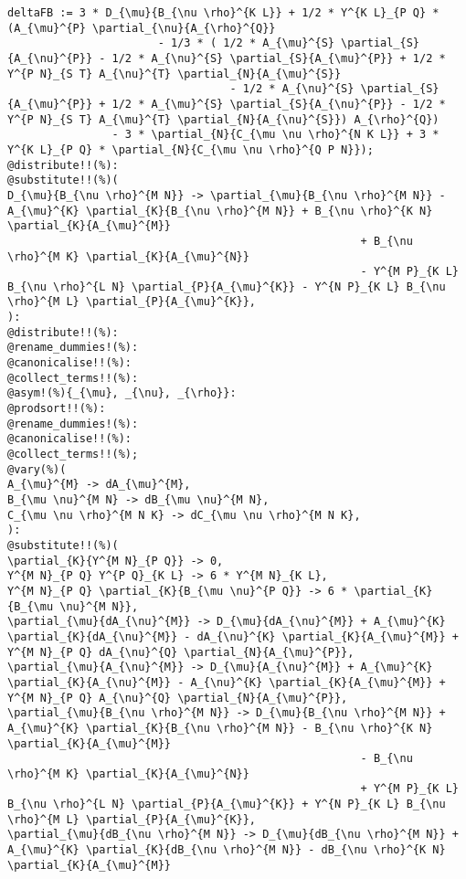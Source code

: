\documentclass[11pt]{article}
\begin{document}
{\color[named]{Blue}\begin{verbatim}
deltaFB := 3 * D_{\mu}{B_{\nu \rho}^{K L}} + 1/2 * Y^{K L}_{P Q} * (A_{\mu}^{P} \partial_{\nu}{A_{\rho}^{Q}} 
                       - 1/3 * ( 1/2 * A_{\mu}^{S} \partial_{S}{A_{\nu}^{P}} - 1/2 * A_{\nu}^{S} \partial_{S}{A_{\mu}^{P}} + 1/2 * Y^{P N}_{S T} A_{\nu}^{T} \partial_{N}{A_{\mu}^{S}}
                                  - 1/2 * A_{\nu}^{S} \partial_{S}{A_{\mu}^{P}} + 1/2 * A_{\mu}^{S} \partial_{S}{A_{\nu}^{P}} - 1/2 * Y^{P N}_{S T} A_{\mu}^{T} \partial_{N}{A_{\nu}^{S}}) A_{\rho}^{Q})
                - 3 * \partial_{N}{C_{\mu \nu \rho}^{N K L}} + 3 * Y^{K L}_{P Q} * \partial_{N}{C_{\mu \nu \rho}^{Q P N}});
@distribute!!(%):
@substitute!!(%)(
D_{\mu}{B_{\nu \rho}^{M N}} -> \partial_{\mu}{B_{\nu \rho}^{M N}} - A_{\mu}^{K} \partial_{K}{B_{\nu \rho}^{M N}} + B_{\nu \rho}^{K N} \partial_{K}{A_{\mu}^{M}}
                                                      + B_{\nu \rho}^{M K} \partial_{K}{A_{\mu}^{N}}
                                                      - Y^{M P}_{K L} B_{\nu \rho}^{L N} \partial_{P}{A_{\mu}^{K}} - Y^{N P}_{K L} B_{\nu \rho}^{M L} \partial_{P}{A_{\mu}^{K}},
):
@distribute!!(%):
@rename_dummies!(%):
@canonicalise!!(%):
@collect_terms!!(%):
@asym!(%){_{\mu}, _{\nu}, _{\rho}}:
@prodsort!!(%):
@rename_dummies!(%):
@canonicalise!!(%):
@collect_terms!!(%);
@vary(%)( 
A_{\mu}^{M} -> dA_{\mu}^{M},
B_{\mu \nu}^{M N} -> dB_{\mu \nu}^{M N},
C_{\mu \nu \rho}^{M N K} -> dC_{\mu \nu \rho}^{M N K},
):
@substitute!!(%)(
\partial_{K}{Y^{M N}_{P Q}} -> 0,
Y^{M N}_{P Q} Y^{P Q}_{K L} -> 6 * Y^{M N}_{K L},
Y^{M N}_{P Q} \partial_{K}{B_{\mu \nu}^{P Q}} -> 6 * \partial_{K}{B_{\mu \nu}^{M N}},
\partial_{\mu}{dA_{\nu}^{M}} -> D_{\mu}{dA_{\nu}^{M}} + A_{\mu}^{K} \partial_{K}{dA_{\nu}^{M}} - dA_{\nu}^{K} \partial_{K}{A_{\mu}^{M}} + Y^{M N}_{P Q} dA_{\nu}^{Q} \partial_{N}{A_{\mu}^{P}},
\partial_{\mu}{A_{\nu}^{M}} -> D_{\mu}{A_{\nu}^{M}} + A_{\mu}^{K} \partial_{K}{A_{\nu}^{M}} - A_{\nu}^{K} \partial_{K}{A_{\mu}^{M}} + Y^{M N}_{P Q} A_{\nu}^{Q} \partial_{N}{A_{\mu}^{P}},
\partial_{\mu}{B_{\nu \rho}^{M N}} -> D_{\mu}{B_{\nu \rho}^{M N}} + A_{\mu}^{K} \partial_{K}{B_{\nu \rho}^{M N}} - B_{\nu \rho}^{K N} \partial_{K}{A_{\mu}^{M}}
                                                      - B_{\nu \rho}^{M K} \partial_{K}{A_{\mu}^{N}}
                                                      + Y^{M P}_{K L} B_{\nu \rho}^{L N} \partial_{P}{A_{\mu}^{K}} + Y^{N P}_{K L} B_{\nu \rho}^{M L} \partial_{P}{A_{\mu}^{K}},
\partial_{\mu}{dB_{\nu \rho}^{M N}} -> D_{\mu}{dB_{\nu \rho}^{M N}} + A_{\mu}^{K} \partial_{K}{dB_{\nu \rho}^{M N}} - dB_{\nu \rho}^{K N} \partial_{K}{A_{\mu}^{M}}

\end{verbatim}}
\end{document}
